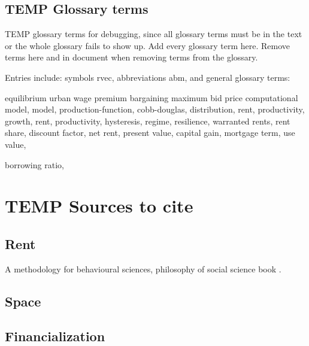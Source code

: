 
\section{TEMP Glossary terms}

TEMP glossary terms for debugging, since all glossary terms must be in the text or the whole glossary fails to show up. Add every glossary term here. Remove terms here and in document when removing terms from the glossary. %

Entries include:  
symbols \gls{rvec}, 
abbreviations \gls{abm}, 
and general glossary terms:



\gls{equilibrium}
\gls{urban wage premium}
\gls{bargaining}
\gls{maximum bid price}
\gls{computational model}, 
\gls{model},  
\gls{production-function}, 
\gls{cobb-douglas}, 
\gls{distribution},
\gls{rent}, 
\gls{productivity}, 
\gls{growth}, 
\gls{rent}, 
\gls{productivity}, 
\gls{hysteresis}, 
\gls{regime}, 
\gls{resilience}, 
\gls{warranted rents}, 
\gls{rent share},
\gls{discount factor},
\gls{net rent}, 
\gls{present value}, 
\gls{capital gain},
\gls{mortgage term},
\gls{use value},

\gls{borrowing ratio},

\chapter{TEMP Sources to cite}

\section{Rent}
A methodology for behavioural sciences, philosophy of social science book \cite{kaplanConductInquiryMethodology2017}.


\section{Space}


\section{Financialization}



